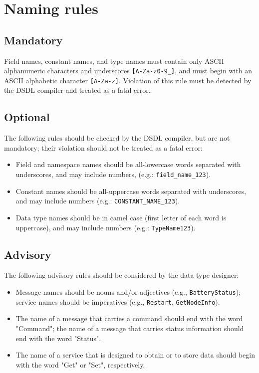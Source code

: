 \section{Naming rules}\label{sec:dsdl_naming_rules}

\subsection{Mandatory}

Field names, constant names, and type names must contain only ASCII alphanumeric characters and underscores
\verb|[A-Za-z0-9_]|,
and must begin with an ASCII alphabetic character \verb|[A-Za-z]|.
Violation of this rule must be detected by the DSDL compiler and treated as a fatal error.

\subsection{Optional}

The following rules should be checked by the DSDL compiler, but are not mandatory;
their violation should not be treated as a fatal error:

\begin{itemize}
    \item Field and namespace names should be all-lowercase words separated with underscores,
          and may include numbers, (e.g.: \verb|field_name_123|).

    \item Constant names should be all-uppercase words separated with underscores,
          and may include numbers (e.g.: \verb|CONSTANT_NAME_123|).

    \item Data type names should be in camel case (first letter of each word is uppercase),
          and may include numbers (e.g.: \verb|TypeName123|).
\end{itemize}

\subsection{Advisory}

The following advisory rules should be considered by the data type designer:

\begin{itemize}
    \item Message names should be nouns and/or adjectives (e.g., \verb|BatteryStatus|);
    service names should be imperatives (e.g., \verb|Restart|, \verb|GetNodeInfo|).

    \item The name of a message that carries a command should end with the word "Command";
          the name of a message that carries status information should end with the word "Status".

    \item The name of a service that is designed to obtain or to store data should begin with the word
          "Get" or "Set", respectively.
\end{itemize}

